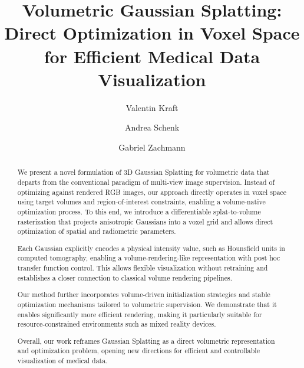 \documentclass[runningheads]{llncs}
\begin{document}
%
\title{Volumetric Gaussian Splatting: Direct Optimization in Voxel Space for Efficient Medical Data Visualization}
%
%
\author{Valentin Kraft \and
Andrea Schenk \and
Gabriel Zachmann}
%
%
%
\maketitle              %
%
\begin{abstract}
We present a novel formulation of 3D Gaussian Splatting for volumetric data that departs from the conventional paradigm of multi-view image supervision. Instead of optimizing against rendered RGB images, our approach directly operates in voxel space using target volumes and region-of-interest constraints, enabling a volume-native optimization process. To this end, we introduce a differentiable splat-to-volume rasterization that projects anisotropic Gaussians into a voxel grid and allows direct optimization of spatial and radiometric parameters.

Each Gaussian explicitly encodes a physical intensity value, such as Hounsfield units in computed tomography, enabling a volume-rendering-like representation with post hoc transfer function control. This allows flexible visualization without retraining and establishes a closer connection to classical volume rendering pipelines.

Our method further incorporates volume-driven initialization strategies and stable optimization mechanisms tailored to volumetric supervision. We demonstrate that it enables significantly more efficient rendering, making it particularly suitable for resource-constrained environments such as mixed reality devices.

Overall, our work reframes Gaussian Splatting as a direct volumetric representation and optimization problem, opening new directions for efficient and controllable visualization of medical data.

\end{abstract}
%
%
%
\end{document}
